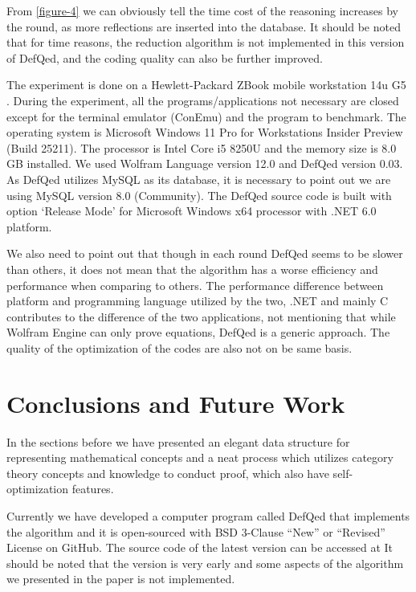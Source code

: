 \documentclass{aims}
\numberwithin{equation}{section}
\numberwithin{theorem}{section}	%
\numberwithin{axiom}{section}	%
\numberwithin{definition}{section}	%
\begin{document}
	From \ref{figure-4} we can obviously tell the time cost of the reasoning increases by the round, as more reflections are inserted into the database. It should be noted that for time reasons, the reduction algorithm is not implemented in this version of DefQed, and the coding quality can also be further improved.
	 
	The experiment is done on a Hewlett-Packard ZBook mobile workstation 14u G5 \cite{HP-2018}. During the experiment, all the programs/applications not necessary are closed except for the terminal emulator (ConEmu) and the program to benchmark. The operating system is Microsoft Windows 11 Pro for Workstations Insider Preview (Build 25211). The processor is Intel Core i5 8250U and the memory size is 8.0 GB installed. We used Wolfram Language version 12.0 and DefQed version 0.03. As DefQed utilizes MySQL as its database, it is necessary to point out we are using MySQL version 8.0 (Community). The DefQed source code is built with option `Release Mode' for Microsoft Windows x64 processor with .NET 6.0 platform.
	
	We also need to point out that though in each round DefQed seems to be slower than others, it does not mean that the algorithm has a worse efficiency and performance when comparing to others. The performance difference between platform and programming language utilized by the two, .NET and mainly C contributes to the difference of the two applications, not mentioning that while Wolfram Engine can only prove equations, DefQed is a generic approach. The quality of the optimization of the codes are also not on be same basis.
	
	\section{Conclusions and Future Work}
	
	In the sections before we have presented an elegant data structure for representing mathematical concepts and a neat process which utilizes category theory concepts and knowledge to conduct proof, which also have self-optimization features.
	
	Currently we have developed a computer program called DefQed that implements the algorithm and it is open-sourced with BSD 3-Clause {``}New{''} or {``}Revised{''} License on GitHub. The source code of the latest version can be accessed at \cite{Wang2022} It should be noted that the version is very early and some aspects of the algorithm we presented in the paper is not implemented.
	
\end{document}
